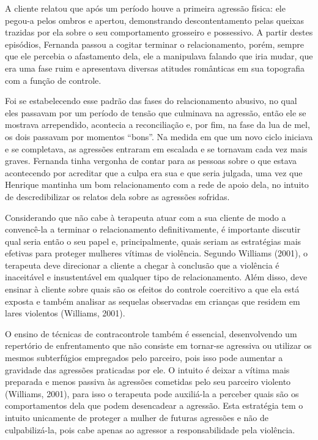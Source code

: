 A cliente relatou que após um período houve a primeira agressão física: ele pegou-a pelos ombros e apertou, demonstrando descontentamento pelas queixas trazidas por ela sobre o seu comportamento grosseiro e possessivo. A partir destes episódios, Fernanda passou a cogitar terminar o relacionamento, porém, sempre que ele percebia o afastamento dela, ele a manipulava falando que iria mudar, que era uma fase ruim e apresentava diversas atitudes românticas em sua topografia com a função de controle.

Foi se estabelecendo esse padrão das fases do relacionamento abusivo, no qual eles passavam por um período de tensão que culminava na agressão, então ele se mostrava arrependido, acontecia a reconciliação e, por fim, na fase da lua de mel, os dois passavam por momentos ``bons''. Na medida em que um novo ciclo iniciava e se completava, as agressões entraram em escalada e se tornavam cada vez mais graves. Fernanda tinha vergonha de contar para as pessoas sobre o que estava acontecendo por acreditar que a culpa era sua e que seria julgada, uma vez que Henrique mantinha um bom relacionamento com a rede de apoio dela, no intuito de descredibilizar os relatos dela sobre as agressões sofridas. 

Considerando que não cabe à terapeuta atuar com a sua cliente de modo a convencê-la a terminar o relacionamento definitivamente, é importante discutir qual seria então o seu papel e, principalmente, quais seriam as estratégias mais efetivas para proteger mulheres vítimas de violência. Segundo Williams (2001), o terapeuta deve direcionar a cliente a chegar à conclusão que a violência é inaceitável e insustentável em qualquer tipo de relacionamento. Além disso, deve ensinar à cliente sobre quais são os efeitos do controle coercitivo a que ela está exposta e também analisar as sequelas observadas em crianças que residem em lares violentos (Williams, 2001).

O ensino de técnicas de contracontrole também é essencial, desenvolvendo um repertório de enfrentamento que não consiste em tornar-se agressiva ou utilizar os mesmos subterfúgios empregados pelo parceiro, pois isso pode aumentar a gravidade das agressões praticadas por ele. O intuito é deixar a vítima mais preparada e menos passiva às agressões cometidas pelo seu parceiro violento (Williams, 2001), para isso o terapeuta pode auxiliá-la a perceber quais são os comportamentos dela que podem desencadear a agressão. Esta estratégia tem o intuito unicamente de proteger a mulher de futuras agressões e não de culpabilizá-la, pois cabe apenas ao agressor a responsabilidade pela violência.

